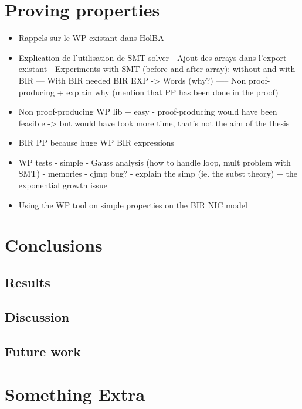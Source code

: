 \documentclass{kththesis}
\begin{document}
\chapter{Proving properties}
\begin{itemize}
\item Rappels sur le WP existant dans HolBA
\item Explication de l'utilisation de SMT solver
- Ajout des arrays dans l'export existant
- Experiments with SMT (before and after array): without and with BIR
--- With BIR needed BIR EXP -> Words (why?)
----- Non proof-producing + explain why (mention that PP has been done in the proof)
\item Non proof-producing WP lib
+ easy
- proof-producing would have been feasible
  -> but would have took more time, that's not the aim of the thesis
\item BIR PP because huge WP BIR expressions
\item WP tests
- simple
- Gauss analysis (how to handle loop, mult problem with SMT)
- memories
- cjmp bug?
- explain the simp (ie. the subst theory) + the exponential growth issue
\item Using the WP tool on simple properties on the BIR NIC model
\end{itemize}

\chapter{Conclusions}

\section{Results}

\section{Discussion}

\section{Future work}

\printbibliography[heading=bibintoc]

\appendix

\chapter{Something Extra}

\tailmatter %
\end{document}

